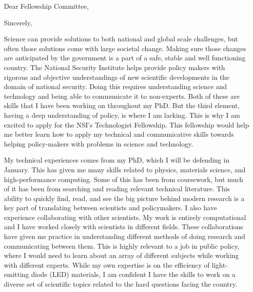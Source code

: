 \thispagestyle{empty}


\date{December 7th, 2018}
\opening{Dear Fellowship Committee,}
\closing{Sincerely,}
\makelettertitle

Science can provide solutions to both national and global scale challenges, but often those solutions come with large societal change. Making sure those changes are anticipated by the government is a part of a safe, stable and well functioning country. The National Security Institute helps provide policy makers with rigorous and objective understandings of new scientific developments in the domain of national security. Doing this requires understanding science and technology and being able to communicate it to non-experts. Both of these are skills that I have been working on throughout my PhD. But the third element, having a deep understanding of policy, is where I am lacking. This is why I am excited to apply for the NSI's Technologist Fellowship. This fellowship would help me better learn how to apply my technical and communicative skills towards helping policy-makers with problems in science and technology.

My technical experiences comes from my PhD, which I will be defending in January. This has given me many skills related to physics, materials science, and high-performance computing. Some of this has been from coursework, but much of it has been from searching and reading relevant technical literature. This ability to quickly find, read, and see the big picture behind modern research is a key part of translating between scientists and policymakers. I also have experience collaborating with other scientists. My work is entirely computational and I have worked closely with scientists in different fields. These collaborations have given me practice in understanding different methods of doing research and communicating between them. This is highly relevant to a job in public policy, where I would need to learn about an array of different subjects while working with different experts. While my own expertise is on the efficiency of light-emitting diode (LED) materials, I am confident I have the skills to work on a diverse set of scientific topics related to the hard questions facing the country.

